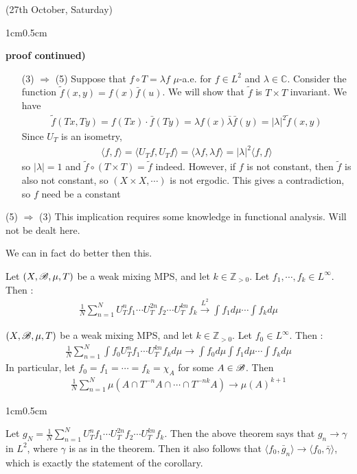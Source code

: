 \documentclass[10pt,a4paper]{report}
\newenvironment{proof}
{\begin{changemargin}{1cm}{0.5cm} 
	}%
	{\end{changemargin}
}
\begin{document}
\newday

(27th October, Saturday)
\s

\begin{proof}
\textbf{proof continued)} \begin{itemize}
\item[(3) $\Rightarrow$ (5)] Suppose that $f\circ T = \lambda f$ $\mu$-a.e. for $f\in L^2$ and $\lambda \in \mathbb{C}$. Consider the function $\tilde{f}(x,y) = f(x)\bar{f}(u)$. We will show that $\tilde{f}$ is $T \times T$ invariant. We have
\begin{align*}
\tilde{f}(Tx,Ty) = f(Tx) \cdot \bar{f}(Ty) = \lambda f(x) \bar{\lambda} \bar{f}(y) = |\lambda|^2 \tilde{f}(x,y)
\end{align*}
Since $U_T$ is an isometry,
\begin{align*}
\langle f, f \rangle = \langle U_T f, U_T f\rangle = \langle \lambda f , \lambda f\rangle = |\lambda|^2 \langle f,f\rangle
\end{align*}
so $|\lambda| =1$ and $\tilde{f} \circ (T \times T) = \tilde{f}$ indeed. However, if $f$ is not constant, then $\tilde{f}$ is also not constant, so $(X\times X, \cdots)$ is not ergodic. This gives a contradiction, so $f$ need be a constant
\end{itemize}
\s

\item[(5) $\Rightarrow$ (3)] This implication requires some knowledge in functional analysis. Will not be dealt here.

\eop
\end{proof}
\s

We can in fact do better then this.
\s

\thm Let $(X,\mathscr{B}, \mu, T)$ be a weak mixing MPS, and let $k\in \mathbb{Z}_{>0}$. Let $f_1,\cdots,f_k \in L^{\infty}$. Then :
\begin{align*}
\frac{1}{N} \sum_{n=1}^N U^n_T f_1 \cdots U^{2n}_T f_2 \cdots U^{kn}_T f_k \xrightarrow{L^2} \int f_1 d\mu \cdots \int f_{k} d\mu
\end{align*}
\s

\cor  $(X,\mathscr{B}, \mu, T)$ be a weak mixing MPS, and let $k\in \mathbb{Z}_{>0}$. Let $f_0 \in L^{\infty}$. Then :
\begin{align*}
\frac{1}{N} \sum_{n=1}^N \int f_0 U^n_T f_1 \cdots U^{kn}_T f_k d\mu \rightarrow \int f_0 d\mu \int f_1 d\mu \cdots \int f_k d\mu
\end{align*}
In particular, let $f_0 = f_1 = \cdots = f_k = \chi_A$ for some $A\in \mathscr{B}$. Then
\begin{align*}
\frac{1}{N}\sum_{n=1}^N \mu(A \cap T^{-n}A \cap \cdots \cap T^{-nk} A) \rightarrow \mu(A)^{k+1}
\end{align*}
\begin{proof}
\pf Let $g_N = \frac{1}{N} \sum_{n=1}^N U^n_T f_1 \cdots U^{2n}_T f_2 \cdots U^{kn}_T f_k$. Then the above theorem says that $g_n \rightarrow \gamma$ in $L^2$, where $\gamma$ is as in the theorem. Then it also follows that $\langle f_0, \bar{g}_n \rangle \rightarrow \langle f_0 , \bar{\gamma}\rangle$, which is exactly the statement of the corollary.

\eop
\end{proof}
\s
\end{document}
